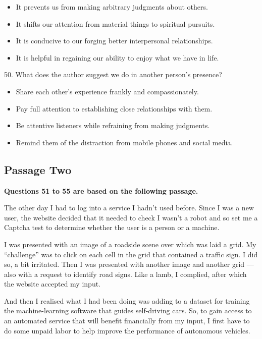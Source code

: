 \documentclass[UTF8,11pt]{ctexart}
\begin{document}
\begin{itemize}[leftmargin=2em,itemsep=.2em,topsep=.4em]\item[A.] It prevents us from making arbitrary judgments about others.
\item[B.] It shifts our attention from material things to spiritual pursuits.
\item[C.] It is conducive to our forging better interpersonal relationships.
\item[D.] It is helpful in regaining our ability to enjoy what we have in life.
\end{itemize}

50. What does the author suggest we do in another person’s presence?


\begin{itemize}[leftmargin=2em,itemsep=.2em,topsep=.4em]\item[A.] Share each other’s experience frankly and compassionately.
\item[B.] Pay full attention to establishing close relationships with them.
\item[C.] Be attentive listeners while refraining from making judgments.
\item[D.] Remind them of the distraction from mobile phones and social media.
\end{itemize}

\subsection*{\textbf{Passage Two}}


\textbf{Questions 51 to 55 are based on the following passage.}


The other day I had to log into a service I hadn’t used before. Since I was a new user, the website decided that it needed to check I wasn’t a robot and so set me a Captcha test to determine whether the user is a person or a machine.


I was presented with an image of a roadside scene over which was laid a grid. My “challenge” was to click on each cell in the grid that contained a traffic sign. I did so, a bit irritated. Then I was presented with another image and another grid — also with a request to identify road signs. Like a lamb, I complied, after which the website accepted my input.


And then I realised what I had been doing was adding to a dataset for training the machine-learning software that guides self-driving cars. So, to gain access to an automated service that will benefit financially from my input, I first have to do some unpaid labor to help improve the performance of autonomous vehicles.
\end{document}
